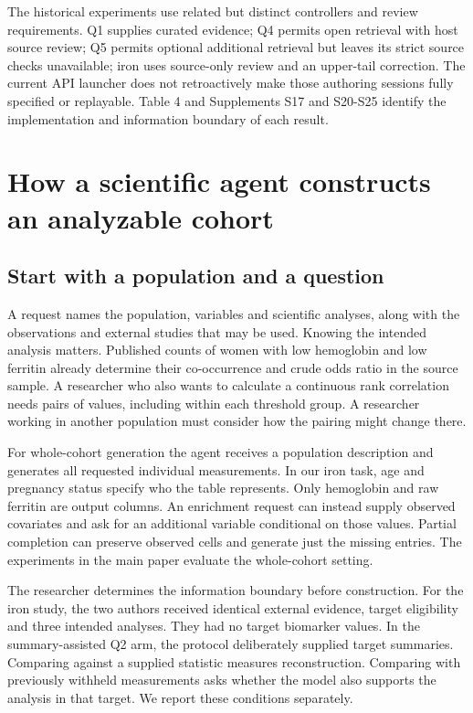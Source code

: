 \documentclass[11pt,letterpaper]{article}
\begin{document}
The historical experiments use related but distinct controllers and review requirements. Q1 supplies curated evidence; Q4 permits open retrieval with host source review; Q5 permits optional additional retrieval but leaves its strict source checks unavailable; iron uses source-only review and an upper-tail correction. The current API launcher does not retroactively make those authoring sessions fully specified or replayable. Table 4 and Supplements S17 and S20-S25 identify the implementation and information boundary of each result.



\section{How a scientific agent constructs an analyzable cohort}

\subsection{Start with a population and a question}

A request names the population, variables and scientific analyses, along with the observations and external studies that may be used. Knowing the intended analysis matters. Published counts of women with low hemoglobin and low ferritin already determine their co-occurrence and crude odds ratio in the source sample. A researcher who also wants to calculate a continuous rank correlation needs pairs of values, including within each threshold group. A researcher working in another population must consider how the pairing might change there.


For whole-cohort generation the agent receives a population description and generates all requested individual measurements. In our iron task, age and pregnancy status specify who the table represents. Only hemoglobin and raw ferritin are output columns. An enrichment request can instead supply observed covariates and ask for an additional variable conditional on those values. Partial completion can preserve observed cells and generate just the missing entries. The experiments in the main paper evaluate the whole-cohort setting.


The researcher determines the information boundary before construction. For the iron study, the two authors received identical external evidence, target eligibility and three intended analyses. They had no target biomarker values. In the summary-assisted Q2 arm, the protocol deliberately supplied target summaries. Comparing against a supplied statistic measures reconstruction. Comparing with previously withheld measurements asks whether the model also supports the analysis in that target. We report these conditions separately.
\end{document}
